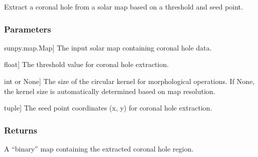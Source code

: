\documentclass[letterpaper,10pt,english]{sphinxmanual}
\begin{document}
\begin{fulllineitems}
\label{\detokenize{pycatch/utils/ch_mapping:pycatch.utils.ch_mapping.extract_ch}}
\pysigstartsignatures
{}
\pysigstopsignatures
\sphinxAtStartPar
Extract a coronal hole from a solar map based on a threshold and seed point.


\subsubsection{Parameters}
\label{\detokenize{pycatch/utils/ch_mapping:id15}}\begin{description}
\sphinxlineitem{map}{[}sunpy.map.Map{]}
\sphinxAtStartPar
The input solar map containing coronal hole data.

\sphinxlineitem{thr}{[}float{]}
\sphinxAtStartPar
The threshold value for coronal hole extraction.

\sphinxlineitem{kernel}{[}int or None{]}
\sphinxAtStartPar
The size of the circular kernel for morphological operations. If None, the kernel size is automatically determined based on map resolution.

\sphinxlineitem{seed}{[}tuple{]}
\sphinxAtStartPar
The seed point coordinates (x, y) for coronal hole extraction.

\end{description}


\subsubsection{Returns}
\label{\detokenize{pycatch/utils/ch_mapping:id16}}\begin{description}
\sphinxAtStartPar
A “binary” map containing the extracted coronal hole region.

\end{description}

\end{fulllineitems}

\end{document}
